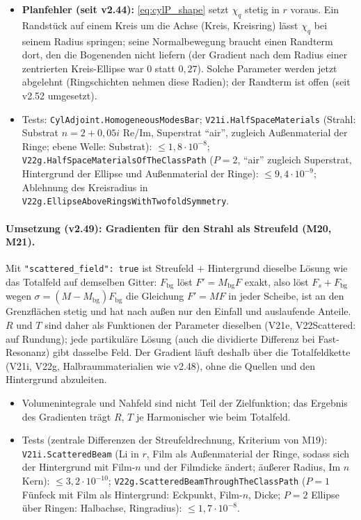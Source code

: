 \begin{itemize}[nosep]
        nach dem Außenmaterial der Ringe in V22g um 2\,\%). \verb|CylBasis::modes| zerlegt eine über die Harmonischen
        blockdiagonale Klassenmatrix jetzt je Block (auch schneller: $2L+1$ Probleme der Größe $4N_k$).
  \item \textbf{Planfehler (seit v2.44):} \eqref{eq:cylP_shape} setzt $\chi_q$ stetig in $r$ voraus. Ein Randstück auf einem
        Kreis um die Achse (Kreis, Kreisring) lässt $\chi_q$ bei seinem Radius springen; seine Normalbewegung braucht einen
        Randterm dort, den die Bogenenden nicht liefern (der Gradient nach dem Radius einer zentrierten Kreis-Ellipse war
        $0$ statt $0{,}27$). Solche Parameter werden jetzt abgelehnt (Ringschichten nehmen diese Radien); der Randterm ist offen
        (seit v2.52 umgesetzt).
  \item Tests: \verb|CylAdjoint.HomogeneousModesBar|; \verb|V21i.HalfSpaceMaterials| (Strahl: Substrat $n=2+0{,}05i$ Re/Im,
        Superstrat \enquote{air}, zugleich Außenmaterial der Ringe; ebene Welle: Substrat): $\le1{,}8\cdot10^{-8}$;
        \verb|V22g.HalfSpaceMaterialsOfTheClassPath| ($P=2$, \enquote{air} zugleich Superstrat, Hintergrund der Ellipse und
        Außenmaterial der Ringe): $\le9{,}4\cdot10^{-9}$; Ablehnung des Kreisradius in \verb|V22g.EllipseAboveRingsWithTwofoldSymmetry|.
\end{itemize}

\paragraph{Umsetzung (v2.49): Gradienten für den Strahl als Streufeld (M20, M21).}
Mit \verb|"scattered_field": true| ist Streufeld $+$ Hintergrund dieselbe Lösung wie das Totalfeld auf demselben Gitter:
$F_{\text{bg}}$ löst $F'=M_{\text{bg}}F$ exakt, also löst $F_s+F_{\text{bg}}$ wegen $\sigma=(M-M_{\text{bg}})F_{\text{bg}}$ die Gleichung
$F'=MF$ in jeder Scheibe, ist an den Grenzflächen stetig und hat nach außen nur den Einfall und auslaufende Anteile.
$R$ und $T$ sind daher als Funktionen der Parameter dieselben (V21e, V22Scattered: auf Rundung); jede partikuläre
Lösung (auch die dividierte Differenz bei Fast-Resonanz) gibt dasselbe Feld. Der Gradient läuft deshalb über die
Totalfeldkette (V21i, V22g, Halbraummaterialien wie v2.48), ohne die Quellen und den Hintergrund abzuleiten.
\begin{itemize}[nosep]
  \item Volumenintegrale und Nahfeld sind nicht Teil der Zielfunktion; das Ergebnis des Gradienten trägt $R$, $T$ je
        Harmonischer wie beim Totalfeld.
  \item Tests (zentrale Differenzen der Streufeldrechnung, Kriterium von M19): \verb|V21i.ScatteredBeam| (Li in $r$, Film
        als Außenmaterial der Ringe, sodass sich der Hintergrund mit Film-$n$ und der Filmdicke ändert; äußerer Radius,
        Im $n$ Kern): $\le3{,}2\cdot10^{-10}$; \verb|V22g.ScatteredBeamThroughTheClassPath| ($P=1$ Fünfeck mit Film als
        Hintergrund: Eckpunkt, Film-$n$, Dicke; $P=2$ Ellipse über Ringen: Halbachse, Ringradius): $\le1{,}7\cdot10^{-8}$.
\end{itemize}

